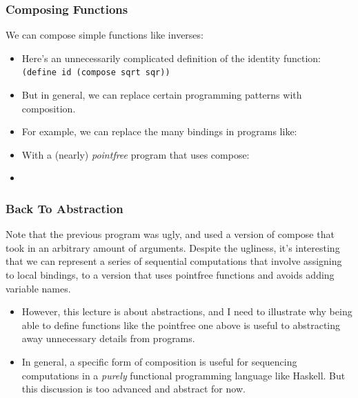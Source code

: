 \documentclass{beamer}
\begin{document}





\begin{frame}
  \frametitle{Composing Functions}
  We can compose simple functions like inverses:
  \begin{itemize}
  \item<2-> Here's an unnecessarily complicated definition of the identity function: \texttt{(define id (compose sqrt sqr))}
  \item<3-> But in general, we can replace certain programming patterns with
    composition.
  \item<4-> For example, we can replace the many bindings in programs like:
    \bindings
  \item<5-> With a (nearly) \emph{pointfree} program that uses compose:
  \item<6-> \pointfree  
  \end{itemize}
\end{frame}

\begin{frame}
  \frametitle{Back To Abstraction}
  Note that the previous program was ugly, and used a version of compose
  that took in an arbitrary amount of arguments.
  Despite the ugliness, it's interesting that we can represent a series of sequential
  computations that involve assigning to local bindings, to a version that
  uses pointfree functions and avoids adding variable names.
  \begin{itemize}
  \item<2-> However, this lecture is about abstractions, and I need to illustrate
    why being able to define functions like the pointfree one above is
    useful to abstracting away unnecessary details from programs.
  \item<3-> In general,
    a specific form of composition is useful for sequencing computations in a
    \emph{purely} functional programming language like Haskell. But this discussion
    is too advanced and abstract for now.  
  \end{itemize}
\end{frame}
\end{document}
